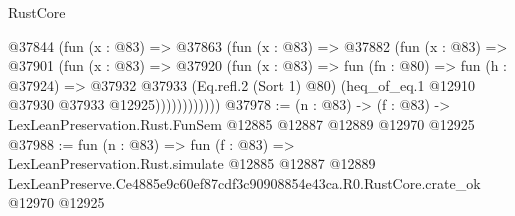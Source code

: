 \begin{lexlean}{RustCore}
\begin{coremodule}
              @37844
                (fun (x : @83) =>
                @37863
                  (fun (x : @83) =>
                  @37882
                    (fun (x : @83) =>
                    @37901
                      (fun (x : @83) =>
                      @37920
                        (fun (x : @83) =>
                        fun (fn : @80) =>
                        fun (h : @37924) =>
                        @37932
                          @37933
                          (Eq.refl.{2} (Sort 1) @80)
                          (heq_of_eq.{1} @12910 @37930 @37933 @12925))))))))))))
@37978 := (n : @83) ->
  (f : @83) -> LexLeanPreservation.Rust.FunSem @12885 @12887 @12889 @12970 @12925
@37988 := fun (n : @83) =>
  fun (f : @83) =>
  LexLeanPreservation.Rust.simulate
    @12885
    @12887
    @12889
    LexLeanPreserve.Ce4885e9c60ef87cdf3c90908854e43ca.R0.RustCore.crate_ok
    @12970
    @12925
\end{coremodule}
\end{lexlean}
